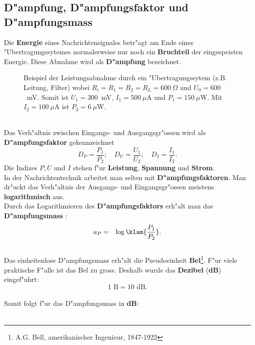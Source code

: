 \subsection {D"ampfung, D"ampfungsfaktor  und D"ampfungsmass}
Die {\bf Energie} eines Nachrichtensignales betr"agt am Ende eines
"Ubertragungssytemes normalerweise nur noch ein {\bf Bruchteil} 
der eingespeisten Energie. Diese Abnahme wird als
{\bf D"ampfung}
bezeichnet.
\bsp{}
\begin{figure}[htb]
\vspace*{-7mm}
\begin{center}
  \caption{Beispiel der Leistungsabnahme durch ein "Ubertragungssytem (z.B. Leitung, Filter) wobei $R_i=R_1=R_2=R_L=600~\Omega$ und $U_0=600$~mV. Somit ist $U_1=300$~mV, $I_1=500~\mu$A und $P_1=150~\mu$W. Mit $I_2=100~\mu$A ist $P_2=6~\mu$W. }
\end{center}
\vspace*{-6mm}
\end{figure} \\
\nit
Das Verh"altnis zwischen Eingangs- und
Ausgangsgr"ossen wird als {\bf D"ampfungsfaktor}  
gekennzeichnet \cite{WYR:99:2}
\begin{equation}
 D_P  = \frac {P_1} {P_2}; \quad D_U   = \frac {U_1} {U_2};\quad D_I   = \frac {I_1} {I_2}. 
\end{equation} 
Die Indizes $P,U$ und $I$ stehen f"ur {\bf Leistung},
{\bf Spannung} und {\bf Strom}.\\ In der Nachrichtentechnik
arbeitet man selten mit {\bf D"ampfungsfaktoren}.  Man dr"uckt das
Verh"altnis der Ausgangs- und Eingangsgr"ossen meistens {\bf
  logarithmisch} aus. \\ Durch das Logarithmieren des
{\bf D"ampfungsfaktors}  erh"alt man das {\bf D"ampfungsmass}
:
\begin{eqnarray*} 
  a_P &=& \log \klam{\frac {P_1} {P_2}}.
\end{eqnarray*}\\ 
Das einheitenlose D"ampfungsmass   erh"alt die Pseudoeinheit
{\bf Bel}\footnote{A.G. Bell, amerikanischer Ingenieur, 1847-1922}. F"ur
viele praktische F"alle ist das Bel  zu gross. Deshalb wurde das
{\bf Dezibel}  ({\bf dB}) eingef"uhrt:
\begin{equation}
 1\mbox{~B} = 10\mbox{~dB}.
\end{equation}\\ 
Somit folgt f"ur das D"ampfungsmass   in {\bf dB}:\\~\\

